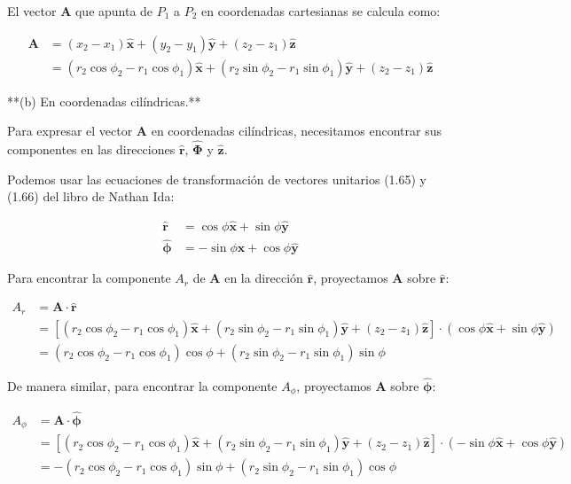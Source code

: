 \documentclass{book}
\begin{document}
El vector $\mathbf{A}$ que apunta de $P_1$ a $P_2$ en coordenadas cartesianas se calcula como:

\begin{align*}
\mathbf{A} &= (x_2 - x_1) \mathbf{\hat{x}} + (y_2 - y_1) \mathbf{\hat{y}} + (z_2 - z_1) \mathbf{\hat{z}} \\
&= (r_2 \cos \phi_2 - r_1 \cos \phi_1) \mathbf{\hat{x}} + (r_2 \sin \phi_2 - r_1 \sin \phi_1) \mathbf{\hat{y}} + (z_2 - z_1) \mathbf{\hat{z}}
\end{align*}

**(b) En coordenadas cilíndricas.**

Para expresar el vector $\mathbf{A}$ en coordenadas cilíndricas, necesitamos encontrar sus componentes en las direcciones $\mathbf{\hat{r}}$, $\mathbf{\hat{\Phi}}$ y $\mathbf{\hat{z}}$. 

Podemos usar las ecuaciones de transformación de vectores unitarios (1.65) y (1.66) del libro de Nathan Ida:

\begin{align*}
\mathbf{\hat{r}} &= \cos \phi \mathbf{\hat{x}} + \sin \phi \mathbf{\hat{y}} \\
\mathbf{\hat{\phi}} &= -\sin \phi \mathbf{\hat{x}} + \cos \phi \mathbf{\hat{y}}
\end{align*}

Para encontrar la componente $A_r$ de $\mathbf{A}$ en la dirección $\mathbf{\hat{r}}$, proyectamos $\mathbf{A}$ sobre $\mathbf{\hat{r}}$:

\begin{align*}
A_r &= \mathbf{A} \cdot \mathbf{\hat{r}} \\
&= [(r_2 \cos \phi_2 - r_1 \cos \phi_1) \mathbf{\hat{x}} + (r_2 \sin \phi_2 - r_1 \sin \phi_1) \mathbf{\hat{y}} + (z_2 - z_1) \mathbf{\hat{z}}] \cdot (\cos \phi \mathbf{\hat{x}} + \sin \phi \mathbf{\hat{y}}) \\
&= (r_2 \cos \phi_2 - r_1 \cos \phi_1) \cos \phi + (r_2 \sin \phi_2 - r_1 \sin \phi_1) \sin \phi 
\end{align*}

De manera similar, para encontrar la componente $A_{\phi}$, proyectamos $\mathbf{A}$ sobre $\mathbf{\hat{\phi}}$:

\begin{align*}
A_{\phi} &= \mathbf{A} \cdot \mathbf{\hat{\phi}} \\
&= [(r_2 \cos \phi_2 - r_1 \cos \phi_1) \mathbf{\hat{x}} + (r_2 \sin \phi_2 - r_1 \sin \phi_1) \mathbf{\hat{y}} + (z_2 - z_1) \mathbf{\hat{z}}] \cdot (-\sin \phi \mathbf{\hat{x}} + \cos \phi \mathbf{\hat{y}}) \\
&= -(r_2 \cos \phi_2 - r_1 \cos \phi_1) \sin \phi + (r_2 \sin \phi_2 - r_1 \sin \phi_1) \cos \phi
\end{align*}
\end{document}

